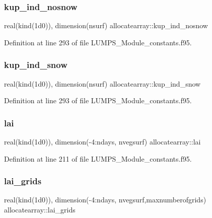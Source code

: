 \subsubsection{\texorpdfstring{kup\+\_\+ind\+\_\+nosnow}{kup\_ind\_nosnow}}
{\footnotesize\ttfamily real(kind(1d0)), dimension(nsurf) allocatearray\+::kup\+\_\+ind\+\_\+nosnow}



Definition at line 293 of file L\+U\+M\+P\+S\+\_\+\+Module\+\_\+constants.\+f95.

\mbox{\label{namespaceallocatearray_a853e1d6db3b8879d2d7657e6e2df0685}} 
\subsubsection{\texorpdfstring{kup\+\_\+ind\+\_\+snow}{kup\_ind\_snow}}
{\footnotesize\ttfamily real(kind(1d0)), dimension(nsurf) allocatearray\+::kup\+\_\+ind\+\_\+snow}



Definition at line 293 of file L\+U\+M\+P\+S\+\_\+\+Module\+\_\+constants.\+f95.

\mbox{\label{namespaceallocatearray_ab660d7e4ca340b0b677a74ecb8bb34f4}} 
\subsubsection{\texorpdfstring{lai}{lai}}
{\footnotesize\ttfamily real(kind(1d0)), dimension(-\/4\+:ndays, nvegsurf) allocatearray\+::lai}



Definition at line 211 of file L\+U\+M\+P\+S\+\_\+\+Module\+\_\+constants.\+f95.

\mbox{\label{namespaceallocatearray_a03eaebbd64063714bff3eaac0920e483}} 
\subsubsection{\texorpdfstring{lai\+\_\+grids}{lai\_grids}}
{\footnotesize\ttfamily real(kind(1d0)), dimension(-\/4\+:ndays, nvegsurf,maxnumberofgrids) allocatearray\+::lai\+\_\+grids}



